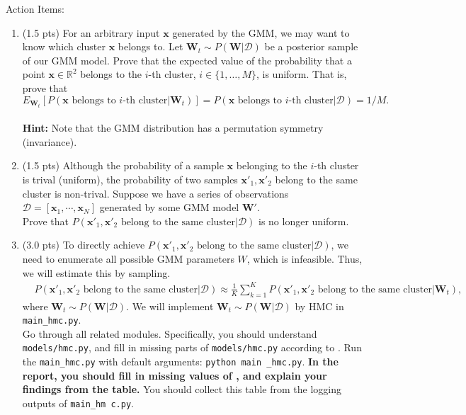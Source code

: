 \documentclass{article}
\newcommand{\mW}{\bm{W}}
\newcommand{\vx}{\bm{x}}
\begin{document}
%
\hfill

%
\noindent Action Items:
%
\begin{enumerate}
%
\item
    (1.5 pts)
    For an arbitrary input $\vx$ generated by the
    GMM, we may want to know which cluster $\vx$ belongs to.
    Let $\mW_{t} \sim P(\mW|\mathcal{D})$ be a posterior sample of our GMM model. Prove that the expected value of the probability that a point $\vx \in \mathbb{R}^2$
belongs to the $i$-th cluster, $i \in \{1,\ldots,M\}$, is uniform. That is, prove that $$E_{\mW_t}[P(\text{$\vx$ belongs to $i$-th cluster} | \mW_t)] =  P(\text{$\vx$ belongs to $i$-th cluster} | \mathcal{D}) = 1 / M.$$
    \\
    \textbf{Hint:}
    Note that the GMM distribution has a permutation symmetry (invariance).
%
\item
    (1.5 pts)
    Although the probability of a sample $\vx$ belonging to the $i$-th cluster is trival (uniform), the probability of two samples $\vx'_{1}, \vx'_{2}$    belong to the same cluster is non-trival.
    Suppose we have a series of observations $\mathcal{D} = [\vx_{1}, \cdots,
    \vx_{N}]$ generated by some GMM model $\mW'$.
    \\
    Prove that $P(\text{$\vx'_{1}, \vx'_{2}$ belong to the same cluster} |
    \mathcal{D}) $ is no longer uniform.
%
\item
    (3.0 pts)
    To directly achieve $P(\text{$\vx'_{1}, \vx'_{2}$ belong to the same
    cluster}| \mathcal{D})$, we need to enumerate all possible GMM parameters $W$, which is
    infeasible.
    Thus, we will estimate this by sampling.
    \begin{align}\label{eq:joint}
    & P(\text{$\vx'_{1}, \vx'_{2}$ belong to the same cluster}|\mathcal{D}) \approx \frac{1}
    {K} \sum\limits_{k = 1}^{K} P(\text{$\vx'_{1}, \vx'_{2}$ belong to the same
    cluster} | \mW_{t}),
    \end{align}
    where $ \mW_{t} \sim P(\mW | \mathcal{D})$.
    We will implement $\mW_{t} \sim P(\mW | \mathcal{D})$ by HMC in
    \texttt{main\_hmc.py}.
    \\
    Go through all related modules. Specifically, you should understand
    \texttt{models/hmc.py}, and fill in missing parts of \texttt{models/hmc.py}
    according to .
    Run the \texttt{main\_hmc.py} with default arguments: \texttt{python main%
    \_hmc.py}.
    \textbf{In the report, you should fill in missing values of ,
    and explain your findings from the table.}
    You should collect this table from the logging outputs of \texttt{main\_hm%
    c.py}.
%
\end{enumerate}
\end{document}
